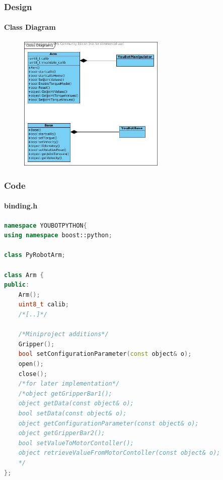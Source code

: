 \documentclass{beamer}
\begin{document}
\begin{frame}
 \frametitle{Design}
 \framesubtitle{Class Diagram}
  \begin{figure}[ht!]
  \centering
  \includegraphics[width=70mm]{img/classdiagram.jpg}
  \caption{}
  \label{Class Diagram}
  \end{figure}
 
\end{frame}


\begin{frame}[fragile]
 \frametitle{Code}
 \framesubtitle{binding.h}
\begin{lstlisting}[language=C++]
namespace YOUBOTPYTHON{
using namespace boost::python;

class PyRobotArm;

class Arm {
public:
    Arm();
    uint8_t calib;
    /*[..]*/

    /*Miniproject additions*/
    Gripper();
    bool setConfigurationParameter(const object& o);
    open();
    close();
    /*for later implementation*/
    /*object getGripperBar1();
    object getData(const object& o);
    bool setData(const object& o);
    object getConfigurationParameter(const object& o);	
    object getGripperBar2();
    bool setValueToMotorContoller();
    object retrieveValueFromMotorContoller(const object& o);
    */
};
\end{lstlisting} 
\end{frame}
\end{document}
